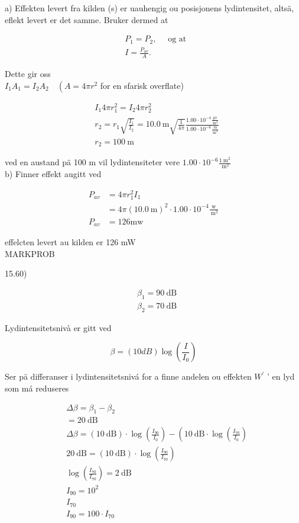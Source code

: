 \documentclass[10pt]{article}
\begin{document}
a) Effekten levert fra kilden (s) er uauhengig ou posisjonens lydintensitet, altsä, eflekt levert er det samme. Bruker dermed at

$$
\begin{aligned}
& P_{1}=P_{2}, \quad \text { og at } \\
& I=\frac{P_{a v}}{A} .
\end{aligned}
$$

Dette gir oss\\
$I_{1} A_{1}=I_{2} A_{2} \quad\left(A=4 \pi r^{2}\right.$ for en sfarisk overflate)

$$
\begin{aligned}
& I_{1} 4 \pi r_{1}^{2}=I_{2} 4 \pi r_{2}^{2} \\
& r_{2}=r_{1} \sqrt{\frac{I_{1}}{I_{2}}}=10.0 \mathrm{~m} \sqrt{\frac{1}{4 \pi}} \frac{1.00 \cdot 10^{-4} \frac{y x}{\mathrm{~m}^{2}}}{1.00 \cdot 10^{-6} \frac{\mathrm{~m}}{\mathrm{~m}^{2}}} \\
& r_{2}=100 \mathrm{~m}
\end{aligned}
$$

ved en austand pä 100 m vil lydintensiteter vere $1.00 \cdot 10^{-6} \frac{1 \mathrm{~m}^{2}}{\mathrm{~m}^{2}}$\\
b) Finner effekt augitt ved

$$
\begin{aligned}
P_{a v} & =4 \pi r_{1}^{2} I_{1} \\
& =4 \pi(10.0 \mathrm{~m})^{2} \cdot 1.00 \cdot 10^{-4} \frac{\mathrm{w}}{\mathrm{~m}^{2}} \\
P_{a v} & =126 \mathrm{mw}
\end{aligned}
$$

effelcten levert au kilden er 126 mW\\

MARKPROB

15.60)

$$
\begin{aligned}
& \beta_{1}=90 \mathrm{~dB} \\
& \beta_{2}=70 \mathrm{~dB}
\end{aligned}
$$

Lydintensitetsnivà er gitt ved

$$
\beta=(10 d B) \log \left(\frac{I}{I_{0}}\right)
$$

Ser pä differanser i lydintensitetsnivá for a finne andelen ou effekten $W^{\prime}$ ' en lyd som má reduseres

$$
\begin{aligned}
& \Delta \beta=\beta_{1}-\beta_{2} \\
&=20 \mathrm{~dB} \\
& \Delta \beta=(10 \mathrm{~dB}) \cdot \log \left(\frac{I_{90}}{I_{0}}\right)-\left(10 \mathrm{~dB} \cdot \log \left(\frac{I_{70}}{I_{0}}\right)\right. \\
& 20 \mathrm{~dB}=(10 \mathrm{~dB}) \cdot \log \left(\frac{I_{90}}{I_{70}}\right) \\
& \log \left(\frac{I_{70}}{I_{70}}\right)=2 \mathrm{~dB} \\
& I_{90}=10^{2} \\
& I_{70} \\
& I_{90}=100 \cdot I_{70}
\end{aligned}
$$
\end{document}
